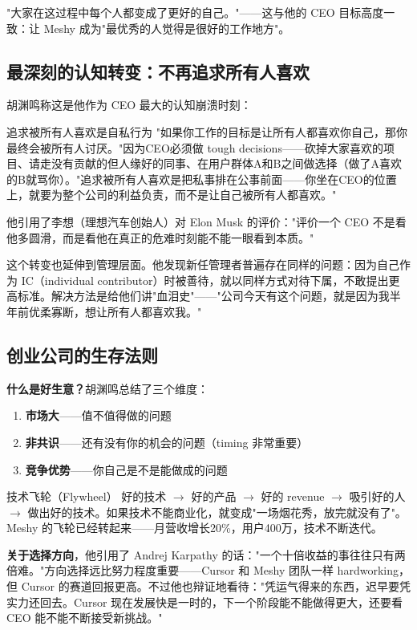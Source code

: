 "大家在这过程中每个人都变成了更好的自己。"——这与他的 CEO 目标高度一致：让 Meshy 成为"最优秀的人觉得是很好的工作地方"。

\subsection{最深刻的认知转变：不再追求所有人喜欢}

胡渊鸣称这是他作为 CEO 最大的认知崩溃时刻：

\begin{warningbox}{追求被所有人喜欢是自私行为}
"如果你工作的目标是让所有人都喜欢你自己，那你最终会被所有人讨厌。"因为CEO必须做 tough decisions——砍掉大家喜欢的项目、请走没有贡献的但人缘好的同事、在用户群体A和B之间做选择（做了A喜欢的B就骂你）。"追求被所有人喜欢是把私事排在公事前面——你坐在CEO的位置上，就要为整个公司的利益负责，而不是让自己被所有人都喜欢。"
\end{warningbox}

他引用了李想（理想汽车创始人）对 Elon Musk 的评价："评价一个 CEO 不是看他多圆滑，而是看他在真正的危难时刻能不能一眼看到本质。"

这个转变也延伸到管理层面。他发现新任管理者普遍存在同样的问题：因为自己作为 IC（individual contributor）时被善待，就以同样方式对待下属，不敢提出更高标准。解决方法是给他们讲"血泪史"——"公司今天有这个问题，就是因为我半年前优柔寡断，想让所有人都喜欢我。"

\subsection{创业公司的生存法则}

\textbf{什么是好生意？}胡渊鸣总结了三个维度：
\begin{enumerate}
\item \textbf{市场大}——值不值得做的问题
\item \textbf{非共识}——还有没有你的机会的问题（timing 非常重要）
\item \textbf{竞争优势}——你自己是不是能做成的问题
\end{enumerate}

\begin{importantbox}{技术飞轮（Flywheel）}
好的技术 $\rightarrow$ 好的产品 $\rightarrow$ 好的 revenue $\rightarrow$ 吸引好的人 $\rightarrow$ 做出好的技术。如果技术不能商业化，就变成"一场烟花秀，放完就没有了"。Meshy 的飞轮已经转起来——月营收增长20\%，用户400万，技术不断迭代。
\end{importantbox}

\textbf{关于选择方向}，他引用了 Andrej Karpathy 的话："一个十倍收益的事往往只有两倍难。"方向选择远比努力程度重要——Cursor 和 Meshy 团队一样 hardworking，但 Cursor 的赛道回报更高。不过他也辩证地看待："凭运气得来的东西，迟早要凭实力还回去。Cursor 现在发展快是一时的，下一个阶段能不能做得更大，还要看 CEO 能不能不断接受新挑战。"

